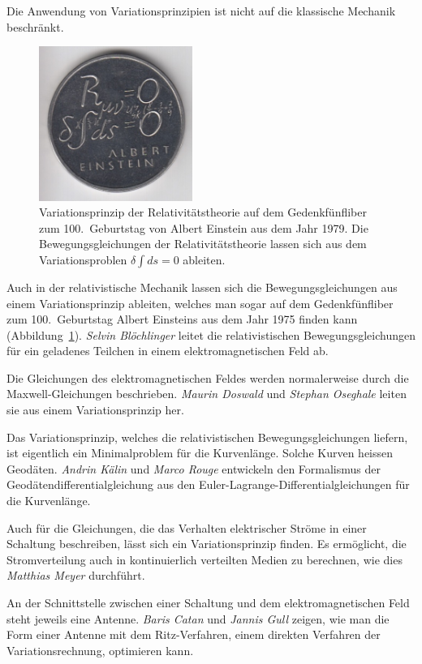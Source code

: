 Die Anwendung von Variationsprinzipien ist nicht auf die
klassische Mechanik beschränkt.
\begin{figure}
\centering
\includegraphics[width=5cm]{papers/Einstein5Fr.jpg}
\caption{Variationsprinzip der Relativitätstheorie auf dem
Gedenkfünfliber zum 100.~Geburtstag von Albert Einstein
aus dem Jahr 1979.
Die Bewegungsgleichungen der Relativitätstheorie lassen sich aus
dem Variationsproblen $\delta \int ds=0$ ableiten.
\label{buch:papers:fig:5liber}}
\end{figure}%
Auch in der relativistische Mechanik lassen sich die Bewegungsgleichungen
aus einem Variationsprinzip ableiten, welches man sogar auf
dem Gedenkfünfliber zum 100.~Geburtstag Albert Einsteins aus dem
Jahr 1975 finden kann (Abbildung~\ref{buch:papers:fig:5liber}).
\textit{Selvin Blöchlinger} leitet die relativistischen
Bewegungsgleichungen für ein geladenes Teilchen in einem
elektromagnetischen Feld ab.

Die Gleichungen des elektromagnetischen Feldes werden normalerweise
durch die Maxwell-Gleichungen beschrieben.
\textit{Maurin Doswald}
und
\textit{Stephan Oseghale}
leiten sie aus einem Variationsprinzip her.

Das Variationsprinzip, welches die relativistischen Bewegungsgleichungen
liefern, ist eigentlich ein Minimalproblem für die Kurvenlänge.
Solche Kurven heissen Geodäten.
\textit{Andrin Kälin}
und
\textit{Marco Rouge}
entwickeln den Formalismus der Geodätendifferentialgleichung aus
den Euler-Lagrange-Differentialgleichungen für die Kurvenlänge.

Auch für die Gleichungen, die das Verhalten elektrischer Ströme in 
einer Schaltung beschreiben, lässt sich ein Variationsprinzip 
finden.
Es ermöglicht, die Stromverteilung auch in kontinuierlich verteilten
Medien zu berechnen, wie dies \textit{Matthias Meyer} durchführt.

An der Schnittstelle zwischen einer Schaltung und dem elektromagnetischen
Feld steht jeweils eine Antenne.
\textit{Baris Catan}
und
\textit{Jannis Gull}
zeigen, wie man die Form einer Antenne mit dem Ritz-Verfahren,
einem direkten Verfahren der Variationsrechnung,
optimieren kann.


